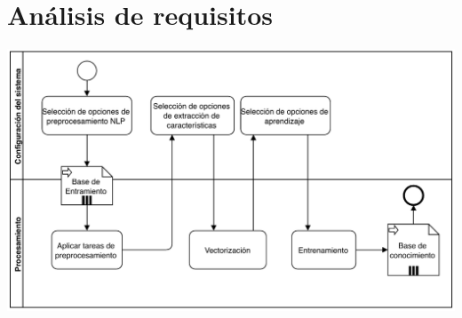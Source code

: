 
\chapter{Análisis de requisitos}

\resizebox{0.5\textwidth}{!}{}

\includegraphics[width=\textwidth]{bpmn-entrenamiento}
